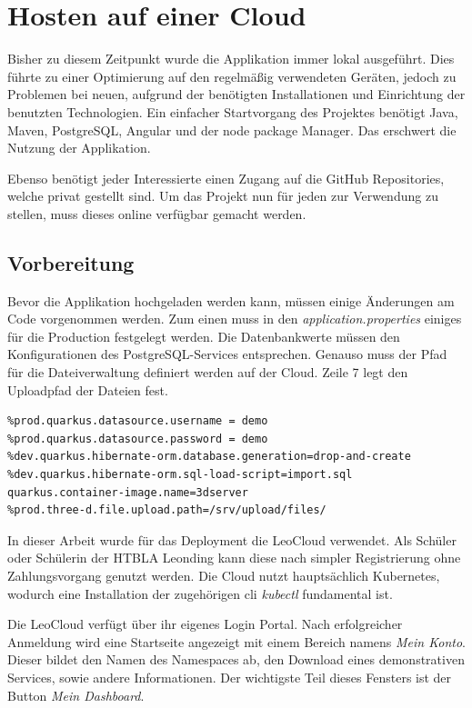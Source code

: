 \section{Hosten auf einer Cloud}

Bisher zu diesem Zeitpunkt wurde die Applikation immer lokal ausgeführt. 
Dies führte zu einer Optimierung auf den regelmäßig verwendeten Geräten, jedoch zu Problemen bei neuen, aufgrund der benötigten Installationen und Einrichtung der benutzten Technologien. 
Ein einfacher Startvorgang des Projektes benötigt Java, Maven, PostgreSQL, Angular und der node package Manager.
Das erschwert die Nutzung der Applikation. 

Ebenso benötigt jeder Interessierte einen Zugang auf die GitHub Repositories, welche privat gestellt sind. 
Um das Projekt nun für jeden zur Verwendung zu stellen, muss dieses online verfügbar gemacht werden. 

\subsection{Vorbereitung}

Bevor die Applikation hochgeladen werden kann, müssen einige Änderungen am Code vorgenommen werden. 
Zum einen muss in den \emph{application.properties} einiges für die Production festgelegt werden. 
Die Datenbankwerte müssen den Konfigurationen des PostgreSQL-Services entsprechen. 
Genauso muss der Pfad für die Dateiverwaltung definiert werden auf der Cloud.
Zeile 7 legt den Uploadpfad der Dateien fest.
\begin{lstlisting}[label=lst:dbconfProd, caption=application.properties für Produktion]
%prod.quarkus.datasource.jdbc.url=jdbc:postgresql://postgres:5432/demo
%prod.quarkus.datasource.username = demo
%prod.quarkus.datasource.password = demo
%dev.quarkus.hibernate-orm.database.generation=drop-and-create
%dev.quarkus.hibernate-orm.sql-load-script=import.sql
quarkus.container-image.name=3dserver
%prod.three-d.file.upload.path=/srv/upload/files/
\end{lstlisting}    

In dieser Arbeit wurde für das Deployment die LeoCloud verwendet. 
Als Schüler oder Schülerin der HTBLA Leonding kann diese nach simpler Registrierung ohne Zahlungsvorgang genutzt werden. 
Die Cloud nutzt hauptsächlich Kubernetes, wodurch eine Installation der zugehörigen \gls{cli} \emph{kubectl} fundamental ist. 

Die LeoCloud verfügt über ihr eigenes Login Portal. 
Nach erfolgreicher Anmeldung wird eine Startseite angezeigt mit einem Bereich namens \emph{Mein Konto}. 
Dieser bildet den Namen des Namespaces ab, den Download eines demonstrativen Services, sowie andere Informationen. 
Der wichtigste Teil dieses Fensters ist der Button \emph{Mein Dashboard}. 

